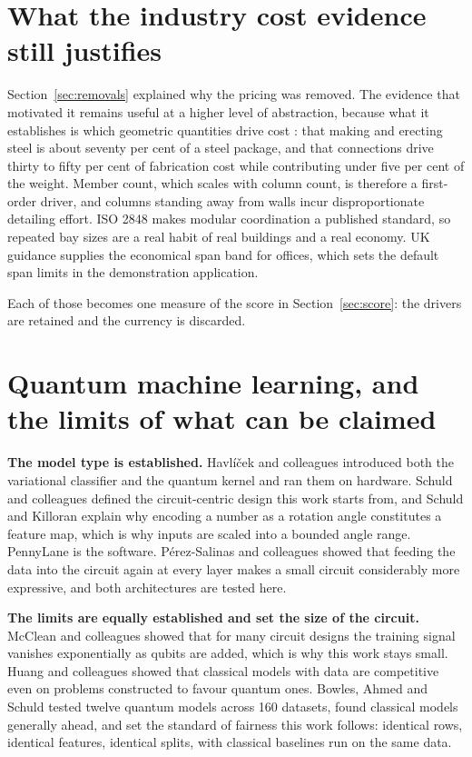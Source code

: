 \section{What the industry cost evidence still justifies}

Section~\ref{sec:removals} explained why the pricing was removed. The
evidence that motivated it remains useful at a higher level of
abstraction, because what it establishes is which geometric quantities
drive cost \citep{aisc_cost}: that making and erecting steel is about
seventy per cent of a steel package, and that connections drive thirty to
fifty per cent of fabrication cost while contributing under five per cent
of the weight. Member count, which scales with column count, is therefore
a first-order driver, and columns standing away from walls incur
disproportionate detailing effort. ISO 2848 \citep{iso2848} makes modular
coordination a published standard, so repeated bay sizes are a real habit
of real buildings and a real economy. UK guidance \citep{sci_grids}
supplies the economical span band for offices, which sets the default span
limits in the demonstration application.

Each of those becomes one measure of the score in
Section~\ref{sec:score}: the drivers are retained and the currency is
discarded.

\section{Quantum machine learning, and the limits of what can be claimed}

\textbf{The model type is established.} Havl\'i\v{c}ek and colleagues
\citep{havlicek2019} introduced both the variational classifier and the
quantum kernel and ran them on hardware. Schuld and colleagues
\citep{schuld2020circuit} defined the circuit-centric design this work
starts from, and Schuld and Killoran
\citep{schuld2019featurehilbert} explain why encoding a number as a
rotation angle constitutes a feature map, which is why inputs are scaled
into a bounded angle range. PennyLane \citep{bergholm2018pennylane} is the
software. P\'erez-Salinas and colleagues
\citep{perezsalinas2020reupload} showed that feeding the data into the
circuit again at every layer makes a small circuit considerably more
expressive, and both architectures are tested here.

\textbf{The limits are equally established and set the size of the
circuit.} McClean and colleagues \citep{mcclean2018barren} showed that for
many circuit designs the training signal vanishes exponentially as qubits
are added, which is why this work stays small. Huang and colleagues
\citep{huang2021powerdata} showed that classical models with data are
competitive even on problems constructed to favour quantum ones. Bowles,
Ahmed and Schuld \citep{bowles2024benchmark} tested twelve quantum models
across 160 datasets, found classical models generally ahead, and set the
standard of fairness this work follows: identical rows, identical
features, identical splits, with classical baselines run on the same data.

